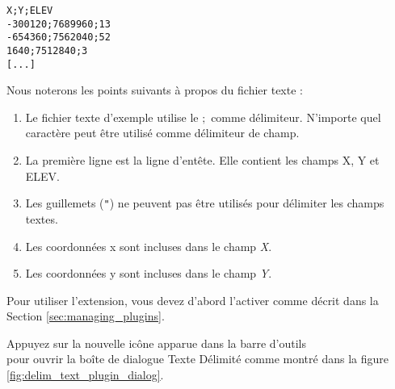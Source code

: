 \begin{verbatim} 
X;Y;ELEV
-300120;7689960;13
-654360;7562040;52
1640;7512840;3
[...]
\end{verbatim}

Nous noterons les points suivants à propos du fichier texte :

\begin{enumerate}
\item Le fichier texte d'exemple utilise le \mbox{$;$} comme délimiteur. 
N'importe quel caractère peut être utilisé comme délimiteur de champ.
\item La première ligne est la ligne d'entête. Elle contient les champs X, Y 
et ELEV.
\item Les guillemets ({\tt{}"{}}) ne peuvent pas être utilisés pour délimiter 
les champs textes.
\item Les coordonnées x sont incluses dans le champ {\em X}.
\item Les coordonnées y sont incluses dans le champ {\em Y}.
\end{enumerate}

Pour utiliser l'extension, vous devez d'abord l'activer comme décrit dans la 
Section \ref{sec:managing_plugins}.

Appuyez sur la nouvelle icône apparue dans la barre d'outils\\ 
pour ouvrir la boîte de dialogue Texte Délimité comme montré dans la figure 
\ref{fig:delim_text_plugin_dialog}.

